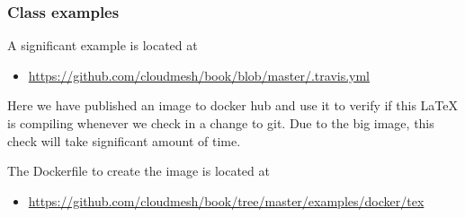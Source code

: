\subsubsection{Class examples}

A significant example is located at

\begin{itemize}
\item
  \url{https://github.com/cloudmesh/book/blob/master/.travis.yml}
\end{itemize}

Here we have published an image to docker hub and use it to verify if
this LaTeX is compiling whenever we check in a change to git. Due to the
big image, this check will take significant amount of time.

The Dockerfile to create the image is located at

\begin{itemize}
\item
  \url{https://github.com/cloudmesh/book/tree/master/examples/docker/tex}
\end{itemize}

